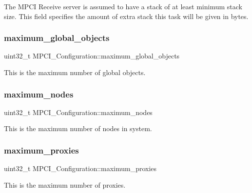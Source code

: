 The M\+P\+CI Receive server is assumed to have a stack of at least minimum stack size. This field specifies the amount of extra stack this task will be given in bytes. \mbox{\label{structMPCI__Configuration_ab8e64dde4b8270e5119d9c09d87e352e}} 
\subsubsection{\texorpdfstring{maximum\_global\_objects}{maximum\_global\_objects}}
{\footnotesize\ttfamily uint32\+\_\+t M\+P\+C\+I\+\_\+\+Configuration\+::maximum\+\_\+global\+\_\+objects}

This is the maximum number of global objects. \mbox{\label{structMPCI__Configuration_a9e2813315e96f6de6ea2876e29749908}} 
\subsubsection{\texorpdfstring{maximum\_nodes}{maximum\_nodes}}
{\footnotesize\ttfamily uint32\+\_\+t M\+P\+C\+I\+\_\+\+Configuration\+::maximum\+\_\+nodes}

This is the maximum number of nodes in system. \mbox{\label{structMPCI__Configuration_a884083fa1462f85fbe5f1a8f88c9659d}} 
\subsubsection{\texorpdfstring{maximum\_proxies}{maximum\_proxies}}
{\footnotesize\ttfamily uint32\+\_\+t M\+P\+C\+I\+\_\+\+Configuration\+::maximum\+\_\+proxies}

This is the maximum number of proxies. \mbox{\label{structMPCI__Configuration_a28038b346b3287c353708e0770f818a8}} 
